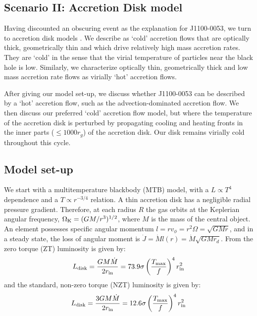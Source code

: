 \documentclass[11pt,a4paper]{article}
\begin{document}
\subsection*{Scenario II: Accretion Disk model}
Having discounted an obscuring event as the explanation for
J1100-0053, we turn to accretion disk models \citep[see also the recent
review by ][]{YuanNarayan2014}. We describe as `cold' accretion flows
that are optically thick, geometrically thin and which drive
relatively high mass accretion rates. They are `cold' in the sense
that the virial temperature of particles near the black hole is
low. Similarly, we characterize optically thin, geometrically thick
and low mass accretion rate flows as virially `hot' accretion flows.

After giving our model set-up, we discuss whether J1100-0053 can be
described by a `hot' accretion flow, such as the advection-dominated
accretion flow. We then discuss our preferred `cold' accretion flow
model, but where the temperature of the accretion disk is perturbed by
propagating cooling and heating fronts in the inner parts ($\leq 1000
r_{g}$) of the accretion disk. Our disk remains virially cold
throughout this cycle.



\subsection{Model set-up}
We start with a multitemperature blackbody (MTB) model, with a $L
\propto T^4$ dependence and a $T \propto r^{-3/4}$ relation. A thin
accretion disk has a negligible radial pressure gradient. Therefore,
at each radius $R$ the gas orbits at the Keplerian angular frequency,
$\Omega_{\rm K} = (GM/r^{3})^{1/2}$, where $M$ is the mass of the
central object.  An element possesses specific angular momentum $l = r
v_{\phi} = r^{2} \Omega = \sqrt{GMr}$, and in a steady state, the loss
of angular moment is $\dot{J} = \dot{M} l(r) = \dot{M}
\sqrt{GMr_{d}}$. 
From \cite{Zimmerman2005} the zero torque (ZT) luminosity is given by:
\begin{equation}
L_{\rm disk}   =  \frac{G M \dot{M}}  {2 r_{\rm in}}    = 73.9 \sigma\left ( \frac{T_{\rm max}}{f}  \right )^{4}  r^{2}_{\rm in} 
\end{equation}
and the standard, non-zero torque (NZT) luminosity is given by:
\begin{equation}
L_{\rm disk} = \frac{3 G M \dot{M}}  {2 r_{\rm in}}    = 12.6 \sigma\left ( \frac{T_{\rm max}}{f}  \right )^{4}  r^{2}_{\rm in} 
\end{equation} 
\end{document}
